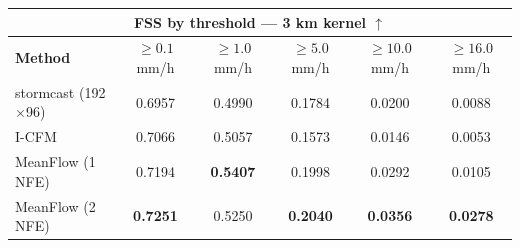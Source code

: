 \documentclass[border=10pt]{standalone}
\begin{document}
\begin{tabular}{lccccc}
\toprule
\multicolumn{6}{c}{\textbf{FSS by threshold — 3 km kernel} $\uparrow$} \\
\midrule
\textbf{Method} & $\geq 0.1$ mm/h & $\geq 1.0$ mm/h & $\geq 5.0$ mm/h & $\geq 10.0$ mm/h & $\geq 16.0$ mm/h \\
\midrule
stormcast (192$\times$96) & 0.6957 & 0.4990 & 0.1784 & 0.0200 & 0.0088 \\
I-CFM & 0.7066 & 0.5057 & 0.1573 & 0.0146 & 0.0053 \\
MeanFlow (1 NFE) & 0.7194 & \textbf{0.5407} & 0.1998 & 0.0292 & 0.0105 \\
MeanFlow (2 NFE) & \textbf{0.7251} & 0.5250 & \textbf{0.2040} & \textbf{0.0356} & \textbf{0.0278} \\
\bottomrule
\end{tabular}
\end{document}
